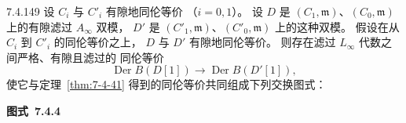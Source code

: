 \begin{theorem}{7.4.149}\label{thm:7-4-149}
设 $C_i$ 与 $C'_i$ 有隙地同伦等价
（$i=0,1$）。
设 $D$ 是
$(C_1,\mathfrak m)$、$(C_0,\mathfrak m)$
上的有隙滤过 $A_\infty$ 双模，
$D'$ 是
$(C'_1,\mathfrak m)$、$(C'_0,\mathfrak m)$
上的这种双模。
假设在从 $C_i$ 到 $C'_i$ 的同伦等价之上，
$D$ 与 $D'$ 有隙地同伦等价。
则存在滤过 $L_\infty$ 代数之间严格、有隙且滤过的
同伦等价
\[
\operatorname{Der}B(D[1])
\longrightarrow
\operatorname{Der}B(D'[1]),
\]
使它与定理~\ref{thm:7-4-41}
得到的同伦等价共同组成下列交换图式：

\par\medskip\noindent\begin{minipage}{\textwidth}
\centering
{}
\par\smallskip
{\renewcommand{\thefigure}{7.4.4}
\normalfont\bfseries 图式~\thefigure\label{diag:7-4-4}}
\end{minipage}\par\medskip
\end{theorem}

